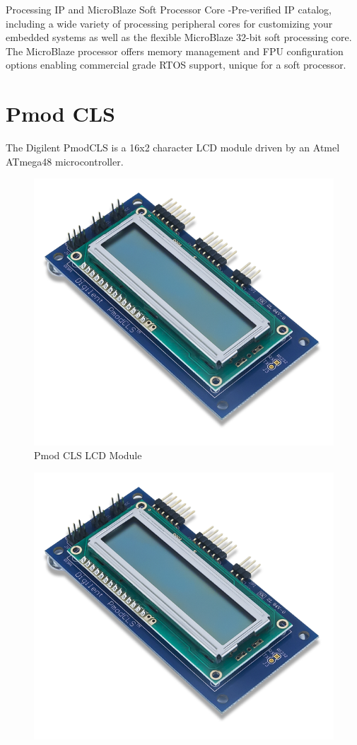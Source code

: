 Processing IP and MicroBlaze Soft Processor Core -Pre-verified IP catalog, including a wide variety of processing peripheral cores for customizing your embedded systems as well as the flexible MicroBlaze 32-bit soft processing core. The MicroBlaze processor offers memory management and FPU configuration options enabling commercial grade RTOS support, unique for a soft processor. \cite{xilinx-xps-edk}

\section{Pmod CLS}
The Digilent PmodCLS is a 16x2 character LCD module driven by an Atmel ATmega48 microcontroller.

\begin{figure}
	\centering
	\includegraphics{images/pmodcls-product.png}
	\caption{Pmod CLS LCD Module}
\end{figure}

\begin{figure}[h]
	\centering
	\includegraphics[width=0.7\linewidth]{images/pmodcls-product}
	\caption[Pmod CLS LCD Module]{}
	\caption{}
	\label{fig:pmodcls-product}
\end{figure}

